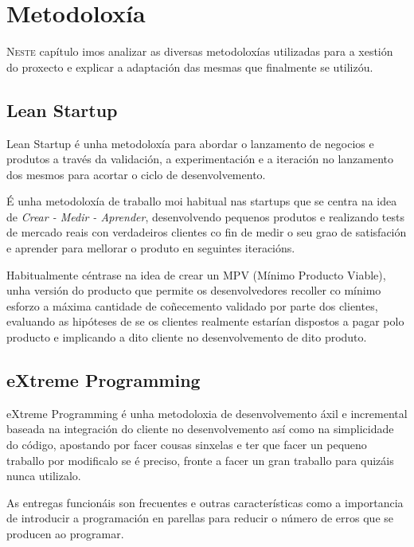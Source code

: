 \chapter{Metodoloxía}
\minitoc


  \lettrine{N}{este} capítulo imos analizar as diversas metodoloxías utilizadas para a 
xestión do proxecto e explicar a adaptación das mesmas que finalmente se utilizóu.

  \section{Lean Startup}
  Lean Startup é unha metodoloxía para abordar o lanzamento de negocios e 
produtos a través da validación, a experimentación e a iteración no lanzamento 
dos mesmos para acortar o ciclo de desenvolvemento.

  É unha metodoloxía de traballo moi habitual nas startups que se centra na 
idea de \emph{Crear - Medir - Aprender}, desenvolvendo pequenos produtos e 
realizando tests de mercado reais con verdadeiros clientes co fin de medir o 
seu grao de satisfación e aprender para mellorar o produto en seguintes 
iteracións.
  
  Habitualmente céntrase na idea de crear un MPV (Mínimo Producto Viable), unha 
versión do producto que permite os desenvolvedores recoller co mínimo esforzo a 
máxima cantidade de coñecemento validado por parte dos clientes, evaluando as 
hipóteses de se os clientes realmente estarían dispostos a pagar polo 
producto e implicando a dito cliente no desenvolvemento de dito produto.
  
  \section{eXtreme Programming}
  eXtreme Programming é unha metodoloxia de desenvolvemento áxil e incremental 
baseada na integración do cliente no desenvolvemento así como na simplicidade 
do código, apostando por facer cousas sinxelas e ter que facer un pequeno 
traballo por modificalo se é preciso, fronte a facer un gran traballo para 
quizáis nunca utilizalo.

  As entregas funcionáis son frecuentes e outras características como a 
importancia de introducir a programación en parellas para reducir o número de 
erros que se producen ao programar.

